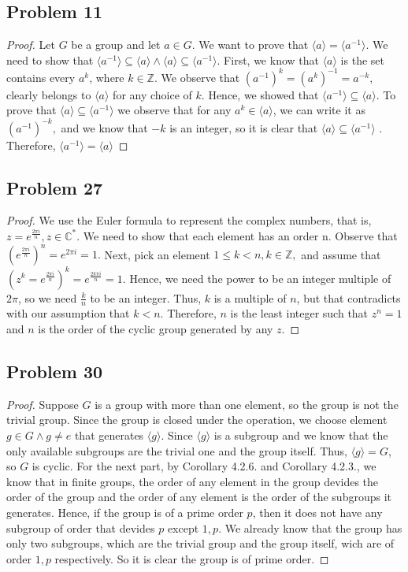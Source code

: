 \documentclass[a4paper,12pt]{article}
\begin{document}
\subsection*{Problem 11}
\begin{proof}
Let $G$ be a group and let $a\in G$. We want to prove that $\langle a \rangle =\langle a^{-1} \rangle.$ We need to show that $\langle a^{-1} \rangle \subseteq \langle a \rangle \wedge \langle a \rangle \subseteq \langle a^{-1} \rangle.$ First, we know that $\langle a \rangle$ is the set contains every $a^k$, where $k \in \mathbb{Z}.$ We observe that $(a^{-1})^k=(a^k)^{-1}=a^{-k},$ clearly belongs to $\langle a \rangle$ for any choice of $k.$ Hence, we showed that $\langle a^{-1} \rangle \subseteq \langle a \rangle.$ To prove that $\langle a \rangle \subseteq \langle a^{-1} \rangle$ we observe that for any $a^k \in \langle a \rangle$, we can write it as $(a^{-1})^{-k},$ and we know that $-k$ is an integer, so it is clear that $\langle a \rangle \subseteq \langle a^{-1} \rangle$ . Therefore, $\langle a^{-1} \rangle = \langle a \rangle$  
\end{proof}
\subsection*{Problem 27}
\begin{proof}
    We use the Euler formula to represent the complex numbers, that is, $z=e^{\frac{2\pi i}{n}}, z \in \mathbb{C}^*$. We need to show that each element has an order n. Observe that $(e^{\frac{2\pi i}{n}})^n=e^{2\pi i}=1.$ Next, pick an element $1\le k<n, k\in \mathbb{Z},$ and assume that $(z^k=e^{\frac{2\pi i}{n}})^k=e^{\frac{2k\pi i}{n}}=1.$ Hence, we need the power to be an integer multiple of $2 \pi$, so we need $\frac{k}{n}$ to be an integer. Thus, $k$ is a multiple of $n$, but that contradicts with our assumption that $k<n.$ Therefore, $n$ is the least integer such that $z^n=1$ and $n$ is the order of the cyclic group generated by any $z.$
\end{proof}
\subsection*{Problem 30}
\begin{proof}
    Suppose $G$ is a group with more than one element, so the group is not the trivial group. Since the group is closed under the operation, we choose element $g \in G \wedge g \neq e$ that generates $\langle g \rangle$. Since $\langle g \rangle$ is a subgroup and we know that the only available subgroups are the trivial one and the group itself. Thus, $\langle g \rangle=G$, so $G$ is cyclic. For the next part, by Corollary 4.2.6. and Corollary 4.2.3., we know that in finite groups, the order of any element in the group devides the order of the group and the order of any element is the order of the subgroups it generates. Hence, if the group is of a prime order $p$, then it does not have any subgroup of order that devides $p$ except $1,p$. We already know that the group has only two subgroups, which are the trivial group and the group itself, wich are of order $1,p$ respectively. So it is clear the group is of prime order.
\end{proof}
\end{document}
